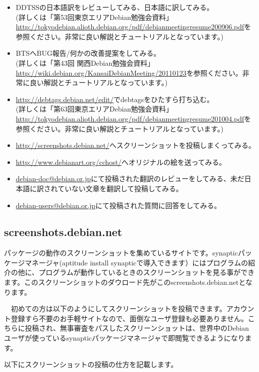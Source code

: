 \documentclass[mingoth,a4paper]{jsarticle}
\begin{document}
\begin{itemize}
\item DDTSSの日本語訳をレビューしてみる、日本語に訳してみる。\\
(詳しくは「第53回東京エリアDebian勉強会資料」\url{http://tokyodebian.alioth.debian.org/pdf/debianmeetingresume200906.pdf}を参照ください。非常に良い解説とチュートリアルとなっています。)
\item BTSへBUG報告/何かの改善提案をしてみる。\\
(詳しくは「第43回 関西Debian勉強会資料」\url{http://wiki.debian.org/KansaiDebianMeeting/20110123}を参照ください。非常に良い解説とチュートリアルとなっています。)
\item \url{http://debtags.debian.net/edit/}でdebtagsをひたすら打ち込む。\\
(詳しくは「第63回東京エリアDebian勉強会資料」\url{http://tokyodebian.alioth.debian.org/pdf/debianmeetingresume201004.pdf}を参照ください。非常に良い解説とチュートリアルとなっています。)
\item \url{http://screenshots.debian.net/}へスクリーンショットを投稿しまくってみる。
\item \url{http://www.debianart.org/cchost/}へオリジナルの絵を送ってみる。
\item \url{debian-doc@debian.or.jp}にて投稿された翻訳のレビューをしてみる、未だ日本語に訳されていない文章を翻訳して投稿してみる。
\item \url{debian-users@debian.or.jp}にて投稿された質問に回答をしてみる。
\end{itemize}

\subsection{screenshots.debian.net}

 パッケージの動作のスクリーンショットを集めているサイトです。synapticパッケージマネージャ(aptitude install synapticで導入できます）にはプログラムの紹介の他に、プログラムが動作しているときのスクリーンショットを見る事ができます。このスクリーンショットのダウロード先がこのscreenshots.debian.netとなります。

　初めての方は以下のようにしてスクリーンショットを投稿できます。アカウント登録すら不要のお手軽サイトなので、面倒なユーザ登録も必要ありません。こちらに投稿され、無事審査をパスしたスクリーンショットは、世界中のDebianユーザが使っているsynapticパッケージマネージャで即閲覧できるようになります。

以下にスクリーンショットの投稿の仕方を記載します。
\end{document}
